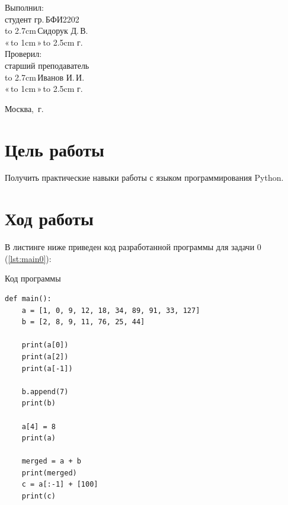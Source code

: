 \documentclass[14pt]{extarticle}
\makeatletter
\newenvironment{code}{\captionsetup{type=listing, belowskip=-14pt plus 3pt minus 0pt}}{}
\newcommand{\hrf}[1]{\hbox to #1{\hrulefill}} %
\newcounter{sectionc} %
\newcommand{\numbersections}{\renewcommand{\Hy@numberline}[1]{##1~}}
\newcommand{\nonumbersections}{\renewcommand{\Hy@numberline}[1]{}}
\let\oldsection\section
\renewcommand{\section}{\numbersections\oldsection}
\let\oldsectionc\sectionc
\renewcommand{\sectionc}{\nonumbersections\oldsectionc}
\renewcommand\tableofcontents{
	\pdfbookmark[sectionc]{\contentsname}{toc} %
	\sectionc*{\contentsname
		\@mkboth{\contentsname}{\contentsname}}
	\@starttoc{toc}
}
\makeatother
\begin{document}
\vfill %

\hfill %
\begin{minipage}{0.45\textwidth} %
	Выполнил:\\[2mm]
	студент гр.\,БФИ2202\\[2mm]
	\hrf{2.7cm}\,Сидорук Д.\,В.\\[2mm]
	«\,\hrf{1cm}\,»\,\hrf{2.5cm}\,\the\year{}\,г.\\[5mm]
	
	Проверил:\\[2mm]
	старший преподаватель\\[2mm]
	\hrf{2.7cm}\,Иванов И.\,И.\\[2mm]
	«\,\hrf{1cm}\,»\,\hrf{2.5cm}\,\the\year{}\,г.
\end{minipage}%

\vfill

\centerline{Москва, \the\year{}\,г.} %
\thispagestyle{empty} %
\newpage %
\tableofcontents %
\newpage %

\section{Цель работы}

Получить практические навыки работы с языком программирования Python.

\section{Ход работы}

В листинге ниже приведен код разработанной программы для задачи 0 (\ref{lst:main0}):

\begin{code}    
\caption{Код программы\label{lst:main0}}
\begin{verbatim}
def main():
	a = [1, 0, 9, 12, 18, 34, 89, 91, 33, 127]
	b = [2, 8, 9, 11, 76, 25, 44]

	print(a[0])
	print(a[2])
	print(a[-1])

	b.append(7)
	print(b)

	a[4] = 8
	print(a)

	merged = a + b
	print(merged)
	c = a[:-1] + [100]
	print(c)
\end{verbatim}
\end{code}
\end{document}
